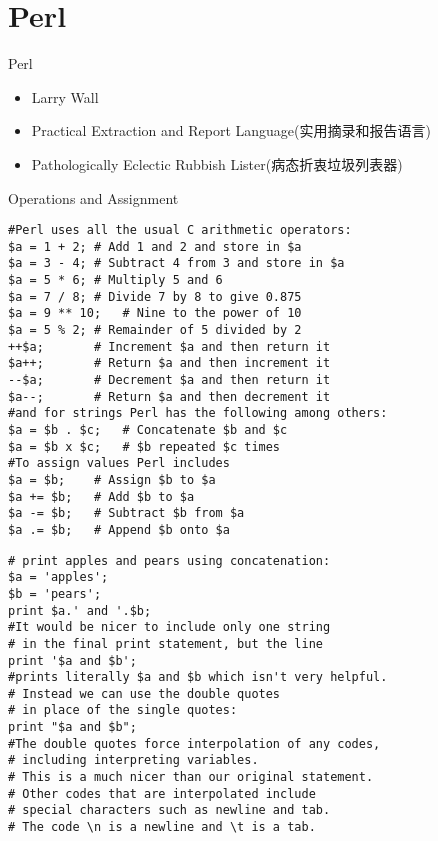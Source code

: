 \section{Perl}
\begin{frame}{Perl}
\begin{itemize}
\item Larry Wall
\item Practical Extraction and Report Language(实用摘录和报告语言)
\item Pathologically Eclectic Rubbish Lister(病态折衷垃圾列表器)
\end{itemize}
\end{frame}

\begin{frame}[containsverbatim]{Operations and Assignment}
\lstset{language=perl}
\begin{lstlisting}
#Perl uses all the usual C arithmetic operators: 
$a = 1 + 2;	# Add 1 and 2 and store in $a
$a = 3 - 4;	# Subtract 4 from 3 and store in $a
$a = 5 * 6;	# Multiply 5 and 6
$a = 7 / 8;	# Divide 7 by 8 to give 0.875
$a = 9 ** 10;	# Nine to the power of 10
$a = 5 % 2;	# Remainder of 5 divided by 2
++$a;		# Increment $a and then return it
$a++;		# Return $a and then increment it
--$a;		# Decrement $a and then return it
$a--;		# Return $a and then decrement it
#and for strings Perl has the following among others: 
$a = $b . $c;	# Concatenate $b and $c
$a = $b x $c;	# $b repeated $c times
#To assign values Perl includes 
$a = $b;	# Assign $b to $a
$a += $b;	# Add $b to $a
$a -= $b;	# Subtract $b from $a
$a .= $b;	# Append $b onto $a
\end{lstlisting}
\end{frame}

\begin{frame}[containsverbatim]{}
\lstset{language=perl}
\begin{lstlisting}
# print apples and pears using concatenation: 
$a = 'apples';
$b = 'pears';
print $a.' and '.$b;
#It would be nicer to include only one string
# in the final print statement, but the line 
print '$a and $b';
#prints literally $a and $b which isn't very helpful.
# Instead we can use the double quotes
# in place of the single quotes: 
print "$a and $b";
#The double quotes force interpolation of any codes,
# including interpreting variables. 
# This is a much nicer than our original statement.
# Other codes that are interpolated include
# special characters such as newline and tab.
# The code \n is a newline and \t is a tab. 
\end{lstlisting}
\end{frame}


